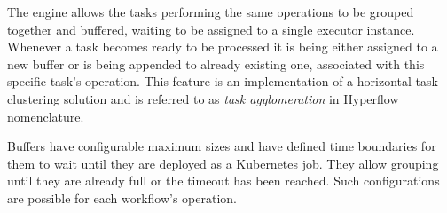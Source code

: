 The engine allows the tasks performing the same operations to be grouped together and buffered, waiting to be assigned to a single executor instance.
Whenever a task becomes ready to be processed it is being either assigned to a new buffer or is being appended to already existing one, associated with this specific task's operation.
This feature is an implementation of a horizontal task clustering solution and is referred to as \emph{task agglomeration} in Hyperflow nomenclature.

Buffers have configurable maximum sizes and have defined time boundaries for them to wait until they are deployed as a Kubernetes job.
They allow grouping until they are already full or the timeout has been reached.
Such configurations are possible for each workflow's operation.

